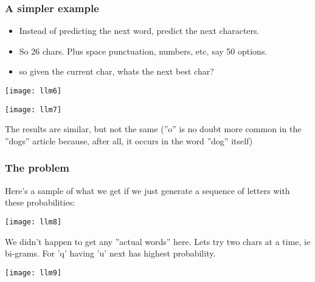 \begin{frame}[fragile]\frametitle{A simpler example}

\begin{itemize}
\item  Instead of predicting the next word, predict the next characters.
\item So 26 chars. Plus space punctuation, numbers, etc, say 50 options.
\item so given the current char, whats the next best char?
\end{itemize}	

\begin{center}
\texttt{[image: llm6]}

\texttt{[image: llm7]}

\end{center}

The results are similar, but not the same (''o'' is no doubt more common in the ''dogs'' article because, after all, it occurs in the word ''dog'' itself)
\end{frame}

\begin{frame}[fragile]\frametitle{The problem}

Here’s a sample of what we get if we just generate a sequence of letters with these probabilities:

\begin{center}
\texttt{[image: llm8]}
\end{center}

We didn’t happen to get any ''actual words'' here. Lets try two chars at a time, ie bi-grams. For 'q' having 'u' next has highest probability.

\begin{center}
\texttt{[image: llm9]}
\end{center}

\end{frame}

